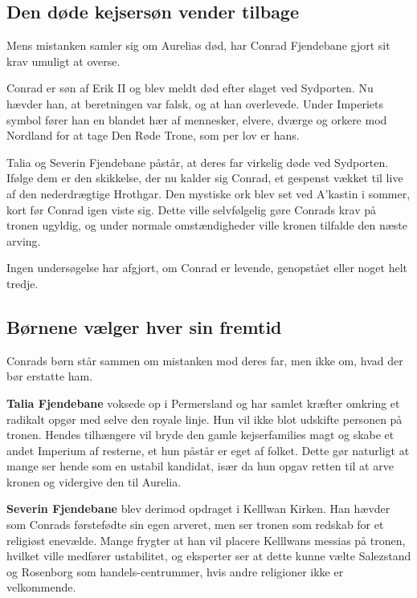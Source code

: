 \documentclass[a5paper,10pt,twoside,openany]{memoir}
\begin{document}
\subsection*{Den døde kejsersøn vender tilbage}

Mens mistanken samler sig om Aurelias død, har Conrad Fjendebane gjort sit krav umuligt at overse.

Conrad er søn af Erik II og blev meldt død efter slaget ved Sydporten. Nu hævder han, at beretningen var falsk, og at han overlevede. Under Imperiets symbol fører han en blandet hær af mennesker, elvere, dværge og orkere mod Nordland for at tage Den Røde Trone, som per lov er hans.

Talia og Severin Fjendebane påstår, at deres far virkelig døde ved Sydporten. Ifølge dem er den skikkelse, der nu kalder sig Conrad, et gespenst vækket til live af den nederdrægtige Hrothgar. Den mystiske ork blev set ved A'kastin i sommer, kort før Conrad igen viste sig. Dette ville selvfølgelig gøre Conrads krav på tronen ugyldig, og under normale omstændigheder ville kronen tilfalde den næste arving.

Ingen undersøgelse har afgjort, om Conrad er levende, genopstået eller noget helt tredje.

\subsection*{Børnene vælger hver sin fremtid}

Conrads børn står sammen om mistanken mod deres far, men ikke om, hvad der bør erstatte ham.

\textbf{Talia Fjendebane} voksede op i Permersland og har samlet kræfter omkring et radikalt opgør med selve den royale linje. Hun vil ikke blot udskifte personen på tronen. Hendes tilhængere vil bryde den gamle kejserfamilies magt og skabe et andet Imperium af resterne, et hun påstår er eget af folket. Dette gør naturligt at mange ser hende som en ustabil kandidat, især da hun opgav retten til at arve kronen og vidergive den til Aurelia.

\textbf{Severin Fjendebane} blev derimod opdraget i Kelllwan Kirken. Han hævder som Conrads førstefødte sin egen arveret, men ser tronen som redskab for et religiøst enevælde. Mange frygter at han vil placere Kelllwans messias på tronen, hvilket ville medfører ustabilitet, og eksperter ser at dette kunne vælte Salezstand og Rosenborg som handels-centrummer, hvis andre religioner ikke er velkommende. 
\end{document}
